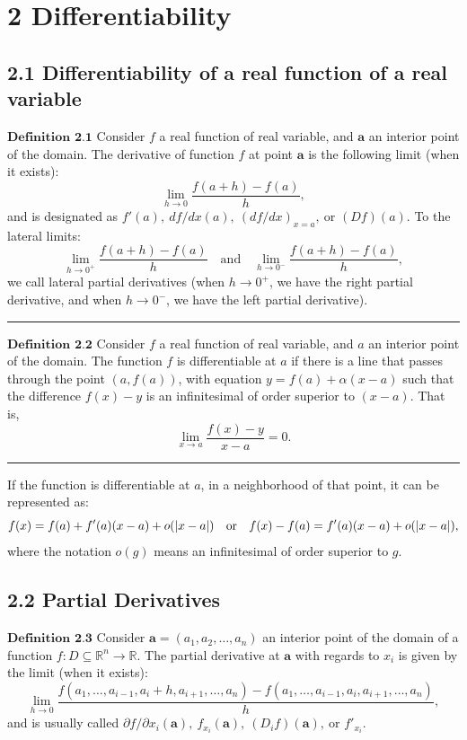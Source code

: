 \documentclass[0pt, a4paper]{article}
\begin{document}
\clearpage

\section*{2 Differentiability}
\subsection*{2.1 Differentiability of a real function of a real variable}

$\textbf{Definition 2.1}$ Consider $f$ a real function of real variable, and $\textbf{a}$ an interior point of the domain. The derivative of function $f$ at point $\textbf{a}$ is the following limit (when it exists):
$$\lim_{h\to0}\frac{f(a+h)-f(a)}{h},$$
and is designated as $f'(a),\ df/dx(a),\ \left( df/dx \right)_{x=a},\ \text{or }(Df)(a)$. To the lateral limits:
$$\lim_{h\to0^+}\frac{f(a+h)-f(a)}{h}\quad\text{and}\quad\lim_{h\to0^-}\frac{f(a+h)-f(a)}{h},$$
we call lateral partial derivatives (when $h\to0^+$, we have the right partial derivative, and when $h\to0^-$, we have the left partial derivative).

\noindent\rule{\textwidth}{1pt}

$\textbf{Definition 2.2}$ Consider $f$ a real function of real variable, and $a$ an interior point of the domain. The function $f$ is differentiable at $a$ if there is a line that passes through the point $(a,f(a))$, with equation $y=f(a)+\alpha(x-a)$ such that the difference $f(x)-y$ is an infinitesimal of order superior to $(x-a)$. That is, 
$$\lim_{x\to a} \frac{f(x)-y}{x-a}=0.$$ 

\noindent\rule{\textwidth}{1pt}

If the function is differentiable at $a$, in a neighborhood of that point, it can be represented as:
$$f(x)=f(a)+f'(a)(x-a)+o(\abs{x-a})\quad\text{or}\quad f(x)-f(a)=f'(a)(x-a)+o(\abs{x-a}),$$
where the notation $o(g)$ means an infinitesimal of order superior to $g$.

\subsection*{2.2 Partial Derivatives}

$\textbf{Definition 2.3}$ Consider $\textbf{a}=(a_1,a_2, \dots, a_n)$ an interior point of the domain of a function $f:D\subseteq\mathbb{R}^n\to\mathbb{R}$. The partial derivative at $\textbf{a}$ with regards to $x_i$ is given by the limit (when it exists):
$$\lim_{h\to0}\frac{f(a_1,\dots,a_{i-1},a_i+h,a_{i+1},\dots,a_n)-f(a_1,\dots,a_{i-1},a_i,a_{i+1},\dots,a_n)}{h},$$ 
and is usually called $\partial f/\partial x_i(\textbf{a}),\  f_{x_i}(\textbf{a}),\ (D_i f)(\textbf{a}),\ \text{or }f'_{x_i}$.
\end{document}

